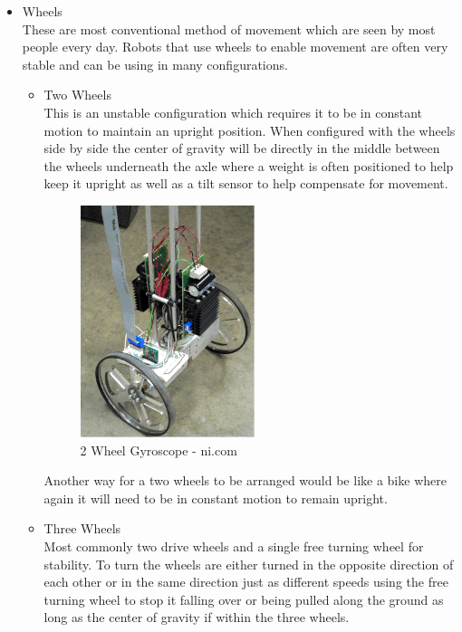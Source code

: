 \begin{itemize}
\item Wheels
\\These are most conventional method of movement which are seen by most people every day.  Robots that use wheels to enable movement are often very stable and can be using in many configurations.
	\begin{itemize}
	\item Two Wheels
	\\This is an unstable configuration which requires it to be in constant motion to maintain an upright position.  When configured with the wheels side by side the center of gravity will be directly in the middle between the wheels underneath the axle where a weight is often positioned to help keep it upright as well as a tilt sensor to help compensate for movement.
\begin{figure}[H]
\centering
        \includegraphics[width=2.0in] {Images/2-wheel-side.png}
        \caption{2 Wheel Gyroscope - ni.com}
        \label{2 Wheel Gyroscope}
\end{figure}
Another way for a two wheels to be arranged would be like a bike where again it will need to be in constant motion to remain upright.


	\item Three Wheels
	\\Most commonly two drive wheels and a single free turning wheel for stability.  To turn the wheels are either turned in the opposite direction of each other or in the same direction just as different speeds using the free turning wheel to stop it falling over or being pulled along the ground as long as the center of gravity if within the three wheels.


\end{itemize}
\end{itemize}
